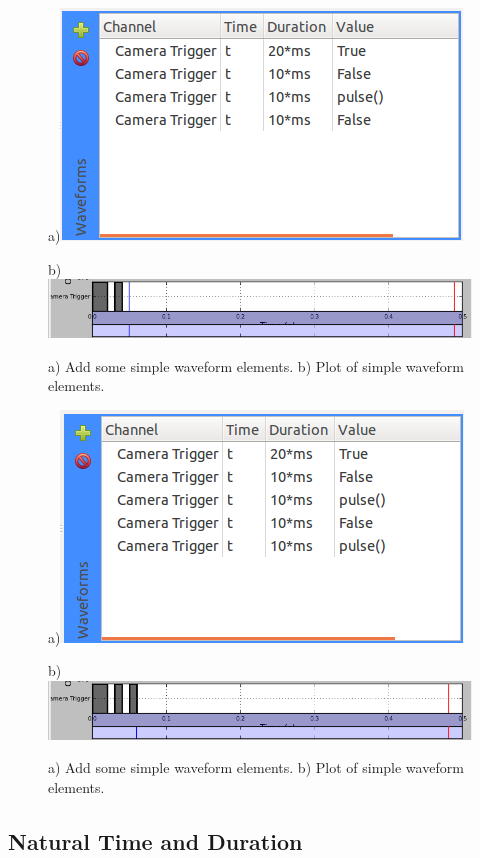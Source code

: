 \begin{figure}[ht]
  \centerline{a)\includegraphics[width=.5\textwidth]{figures/waveform-2}}
  \centerline{b)\includegraphics[width=.8\textwidth]{figures/plot-2}}
  \caption{a) Add some simple waveform elements. b) Plot of simple
  waveform elements.}
  \label{fig:quick:waveform-2}
\end{figure}

\begin{figure}[ht]
  \centerline{a)\includegraphics[width=.5\textwidth]{figures/waveform-3}}
  \centerline{b)\includegraphics[width=.8\textwidth]{figures/plot-3}}
  \caption{a) Add some simple waveform elements. b) Plot of simple
  waveform elements.}
  \label{fig:quick:waveform-3}
\end{figure}


\subsection{Natural Time and Duration}

